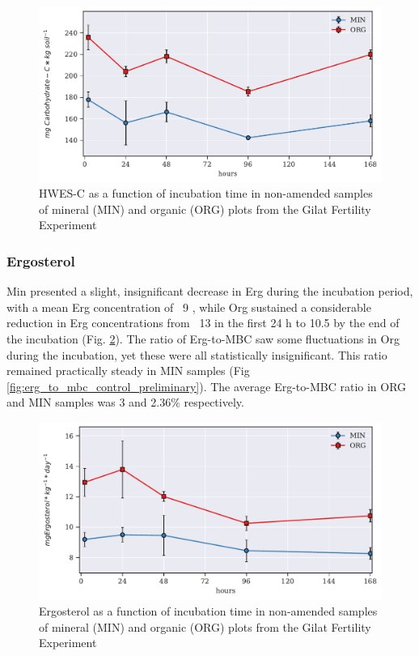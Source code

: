             \begin{figure}[H]
                \centering
                \includegraphics[scale=0.8]{thesis_figures/preliminary/control//HWES-C.pdf}
                \caption{HWES-C  as a function of incubation time in non-amended samples  of mineral (MIN) and organic (ORG) plots from the Gilat Fertility Experiment}
                \label{fig:hwes-c_control_preliminary}
            \end{figure}

        \subsubsection{Ergosterol}
            Min presented a slight, insignificant decrease in Erg during the incubation period, with a mean Erg concentration of ~9 \genericunit, while Org sustained a considerable reduction in Erg concentrations from ~13 \genericunit in the first 24 h to 10.5 \genericunit by the end of the incubation (Fig. \ref{fig:erg_control_preliminary}). The ratio of Erg-to-MBC saw some fluctuations in Org during the incubation, yet these were all statistically insignificant. This ratio remained practically steady in MIN samples (Fig \ref{fig:erg_to_mbc_control_preliminary}). The average Erg-to-MBC ratio in ORG and MIN samples was 3 and 2.36\% respectively.

            \begin{figure}[H]
                \centering
                \includegraphics[scale=0.8]{thesis_figures/preliminary/control/Erg.pdf}
                \caption{Ergosterol  as a function of incubation time in non-amended samples  of mineral (MIN) and organic (ORG) plots from the Gilat Fertility Experiment}
                \label{fig:erg_control_preliminary}
            \end{figure}

